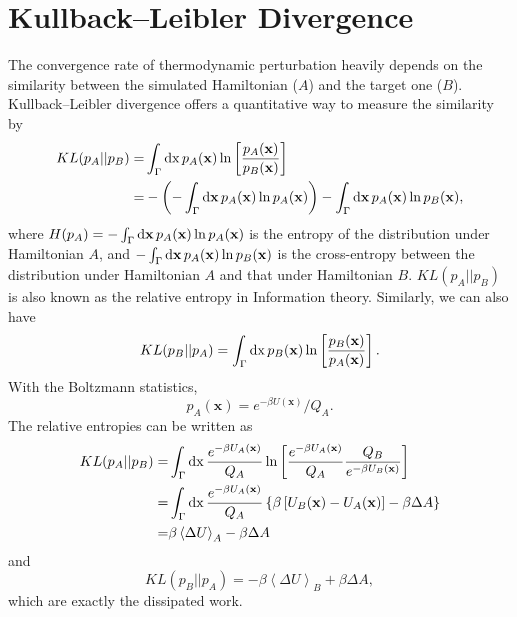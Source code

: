 \section{Kullback–Leibler Divergence\label{Sec:Eva:KLDverg}}
The convergence rate of thermodynamic perturbation heavily depends on the similarity between the simulated Hamiltonian ($A$) and the target one ($B$). Kullback–Leibler divergence offers a quantitative way to measure the similarity by
\begin{align}
	KL(p_A||p_B)=&\int_\Gamma \mathop{}\!\mathrm{d} \mathrm{x}\, p_A(\mathbf{x})\ln\left[\frac{p_A(\mathbf{x})}{p_B(\mathbf{x})}\right]\notag\\
	   =&-\left(-\int_\Gamma \mathop{}\!\mathrm{d} \mathbf{x}\, p_A(\mathbf{x})\ln p_A(\mathbf{x})\right)-\int_\Gamma \mathop{}\!\mathrm{d} \mathbf{x}\, p_A(\mathbf{x})\ln p_B(\mathbf{x}),
\end{align}
where $H(p_A)=-\int_\Gamma \mathop{}\!\mathrm{d} \mathbf{x}\, p_A(\mathbf{x})\ln p_A(\mathbf{x})$ is the entropy of the distribution under Hamiltonian $A$, and $-\int_\Gamma \mathop{}\!\mathrm{d} \mathbf{x}\, p_A(\mathbf{x})\ln p_B(\mathbf{x})$ is the cross-entropy between the distribution under Hamiltonian $A$ and that under Hamiltonian $B$. $KL(p_A||p_B)$ is also known as the relative entropy in Information theory. Similarly, we can also have
\begin{equation}
	KL(p_B||p_A)=\int_\Gamma \mathop{}\!\mathrm{d} \mathrm{x}\, p_B(\mathbf{x})\ln\left[\frac{p_B(\mathbf{x})}{p_A(\mathbf{x})}\right].
\end{equation}
With the Boltzmann statistics,
\begin{equation}
	p_A(\mathbf{x})=e^{-\beta U(\mathbf{x})}/Q_A.
\end{equation}
The relative entropies can be written as
\begin{align}
	KL(p_A||p_B)=&\int_\Gamma \mathop{}\!\mathrm{d} \mathrm{x}\, \frac{e^{-\beta U_A(\mathbf{x})}}{Q_A}\ln\left[\frac{e^{-\beta U_A(\mathbf{x})}}{Q_A}\frac{Q_B}{e^{-\beta U_B(\mathbf{x})}}\right]\notag\\
	   =&\int_\Gamma \mathop{}\!\mathrm{d} \mathrm{x}\, \frac{e^{-\beta U_A(\mathbf{x})}}{Q_A} \left\{\beta \left[U_B(\mathbf{x})-U_A(\mathbf{x})\right]-\beta \Delta A\right\}\\
	   =&\beta\left<\Delta U\right>_A-\beta \Delta A
\end{align}
and
\begin{equation}
	KL(p_B||p_A)=-\beta\left<\Delta U\right>_B+\beta \Delta A,
\end{equation}
which are exactly the dissipated work\cite{WuJCP2005}.

